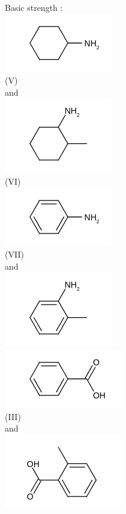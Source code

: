 \documentclass[10pt]{article}
\begin{document}
Basic strength :\\
\includegraphics{smile-24b706bc7f78ac2e1182dae8972be13a4fd7b83b}\\
(V)\\
and\\
\includegraphics{smile-4557abad805ce0e04e17cfad9cae911b9c459680}\\
(VI)\\
\includegraphics{smile-821281278c27490c2f4d92db8045694c892e7b1f}\\
(VII)\\
and\\
\includegraphics{smile-15d03b25631d9e2b0749b558528924258d027f18}\\
\includegraphics{smile-c16c0f873883b36023172517f4af720f6a1f9cf9}\\
(III)\\
and\\
\includegraphics{smile-c10d9ec8037311e57c5a54a65017048b631d925d}\\
\end{document}
